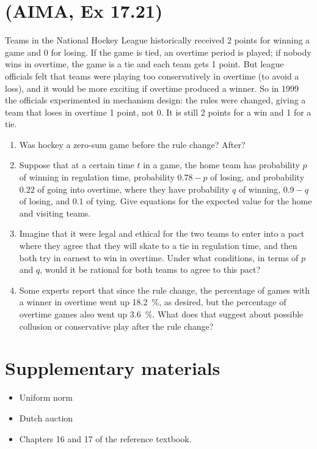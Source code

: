 \documentclass[11pt, a4paper]{article}
\begin{document}
\newpage

\section{(AIMA, Ex 17.21)}

Teams in the National Hockey League historically received 2 points for winning a game and 0 for losing. If the game is tied, an overtime period is played; if nobody wins in overtime, the game is a tie and each team gets 1 point. But league officials felt that teams were playing too conservatively in overtime (to avoid a loss), and it would be more exciting if overtime produced a winner. So in 1999 the officials experimented in mechanism design: the rules were changed, giving a team that loses in overtime 1 point, not 0. It is still 2 points for a win and 1 for a tie.

\begin{enumerate}
    \item Was hockey a zero-sum game before the rule change? After?

    \item Suppose that at a certain time $t$ in a game, the home team has probability $p$ of winning in regulation time, probability $0.78 - p$ of losing, and probability $0.22$ of going into overtime, where they have probability $q$ of winning, $0.9 - q$ of losing, and $0.1$ of tying. Give equations for the expected value for the home and visiting teams.

    \item Imagine that it were legal and ethical for the two teams to enter into a pact where they agree that they will skate to a tie in regulation time, and then both try in earnest to win in overtime. Under what conditions, in terms of $p$ and $q$, would it be rational for both teams to agree to this pact?

    \item Some experts report that since the rule change, the percentage of games with a winner in overtime went up \qty{18.2}{\percent}, as desired, but the percentage of overtime games also went up \qty{3.6}{\percent}. What does that suggest about possible collusion or conservative play after the rule change?
\end{enumerate}

\newpage

\section*{Supplementary materials}

\begin{itemize}
    \item Uniform norm


    \item Dutch auction


    \item Chapters 16 and 17 of the reference textbook.
\end{itemize}
\end{document}
